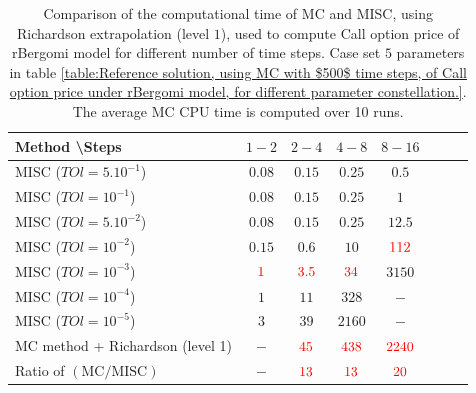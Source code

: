 \documentclass[11pt]{article}
\begin{document}
\begin{table}[h!]
	\centering
	\begin{tabular}{l*{6}{c}r}
		Method \textbackslash  Steps            & $1-2$ & $2-4$ & $4-8$ & $8-16$ &   \\
		\hline
		MISC ($TOl=5.10^{-1}$)   & $0.08$ & $0.15$ & $0.25$ & $0.5$  \\
		MISC ($TOl=10^{-1}$)   &$0.08$ &  $0.15$ & $0.25$ & $1$  \\
		MISC ($TOl=5.10^{-2}$)  &$0.08$  &  $0.15$ & $0.25$ & $12.5$  \\
		MISC ($TOl=10^{-2}$)   & $0.15$ & $0.6$ & $10$ & ${\color{red}112}$  \\
		MISC ($TOl=10^{-3}$)  & ${\color{red}1}$ & ${\color{red}3.5}$ & ${\color{red}34}$ & $3150$ \\
		MISC ($TOl=10^{-4}$)  & $1$ & $11$ & $328$ & $-$  \\
		MISC ($TOl=10^{-5}$)  & $3$ & $39$ & $2160$ & $-$  \\
		\hline	
			MC method + Richardson (level 1)  &$-$ & ${\color{red}45}$  & ${\color{red}438}$  & ${\color{red}2240}$ \\
			
			\hline
				Ratio of $\left(\text{MC}/ \text{MISC} \right)$  &$-$ & ${\color{red}13}$  & ${\color{red}13}$  & ${\color{red}20}$ \\
		\hline
	\end{tabular}
	\caption{Comparison of the computational time of  MC and MISC, using Richardson extrapolation (level $1$), used to compute Call option price of rBergomi model for different number of time steps. Case set $5$ parameters in table \ref{table:Reference solution, using MC with $500$ time steps, of Call option price under rBergomi model, for different parameter constellation.}. The
average MC CPU time is computed over 10 runs.}
	\label{Comparsion of the computational time of  MC and MISC, using Richardson extrapolation (level $1$), used to compute Call option price of rBergomi model for different number of time steps. Case set $5$ parameters}
\end{table}
\end{document}
